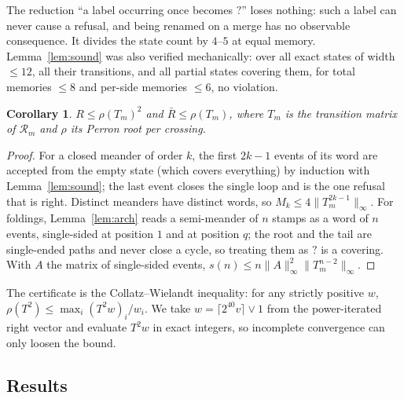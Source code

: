 \documentclass[11pt]{amsart}
\newtheorem{corollary}[theorem]{Corollary}
\theoremstyle{definition}
\newcommand{\Rb}{\bar R}
\newcommand{\Rel}{\mathcal R}
\newcommand{\qq}{\mathord{?}}
\begin{document}
The reduction ``a label occurring once becomes $\qq$'' loses nothing: such a label can never cause a refusal, and being renamed on a merge has no observable consequence. It divides the state count by $4$--$5$ at equal memory. Lemma~\ref{lem:sound} was also verified mechanically: over all exact states of width $\le12$, all their transitions, and all partial states covering them, for total memories $\le8$ and per-side memories $\le6$, no violation.

\begin{corollary}\label{cor:upper}
$R\le\rho(T_m)^2$ and $\Rb\le\rho(T_m)$, where $T_m$ is the transition matrix of $\Rel_m$ and $\rho$ its Perron root per crossing.
\end{corollary}

\begin{proof}
For a closed meander of order $k$, the first $2k-1$ events of its word are accepted from the empty state (which covers everything) by induction with Lemma~\ref{lem:sound}; the last event closes the single loop and is the one refusal that is right. Distinct meanders have distinct words, so $M_k\le4\|T_m^{2k-1}\|_\infty$. For foldings, Lemma~\ref{lem:arch} reads a semi-meander of $n$ stamps as a word of $n$ events, single-sided at position $1$ and at position $q$; the root and the tail are single-ended paths and never close a cycle, so treating them as $\qq$ is a covering. With $A$ the matrix of single-sided events, $s(n)\le n\|A\|^2_\infty\|T_m^{n-2}\|_\infty$.
\end{proof}

The certificate is the Collatz--Wielandt inequality: for any strictly positive $w$, $\rho(T^2)\le\max_i(T^2w)_i/w_i$. We take $w=\lceil2^{40}v\rceil\vee1$ from the power-iterated right vector and evaluate $T^2w$ in exact integers, so incomplete convergence can only loosen the bound.

\subsection{Results}
\end{document}
